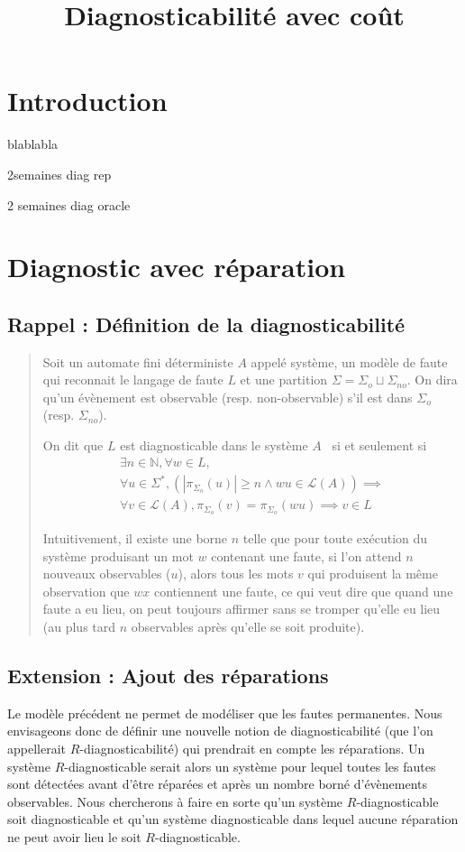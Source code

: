 \documentclass[a4paper,10pt]{article}
\title{Diagnosticabilit\'e avec co\^ut}
\begin{document}
\section*{Introduction}

blablabla

2semaines diag rep

2 semaines diag oracle

\section{Diagnostic avec r\'eparation}
\subsection{Rappel : Définition de la diagnosticabilité}
\begin{quote}
Soit un automate fini d\'eterministe $A$ appel\'e syst\`eme, un modèle de faute qui reconnait le langage de faute $L$ et une partition $\Sigma=\Sigma_o\sqcup \Sigma_{no}$. On dira qu'un \'ev\`enement est observable (resp. non-observable) s'il est dans $\Sigma_o$ (resp. $\Sigma_{no}$).

On dit que $L$ est diagnosticable dans le système $A$~\cite{SamSRST96}  si et seulement si $$\begin{array}{l}
\exists n \in \mathbb N, \forall w \in L,\\
\forall u \in \Sigma^*, \left(\left|\pi_{\Sigma_o}(u)\right|\ge n \land wu \in \mathcal L(A)\right) \implies\\
\forall v \in \mathcal L(A), \pi_{\Sigma_o}(v)=\pi_{\Sigma_o}(wu) \implies v \in L
\end{array}$$

Intuitivement, il existe une borne $n$ telle que pour toute ex\'ecution du système produisant un mot $w$ contenant une faute, si l'on attend $n$ nouveaux observables ($u$), alors tous les mots $v$ qui produisent la m\^eme observation que $wx$ contiennent une faute, ce qui veut dire que quand une faute a eu lieu, on peut toujours affirmer sans se tromper qu'elle eu lieu (au plus tard $n$ observables après qu'elle se soit produite).
\end{quote}

\subsection{Extension : Ajout des r\'eparations}

Le mod\`ele pr\'ec\'edent ne permet de mod\'eliser que les fautes permanentes. Nous envisageons donc de d\'efinir une nouvelle notion de diagnosticabilit\'e (que l'on appellerait $R$-diagnosticabilit\'e) qui prendrait en compte les r\'eparations. Un syst\`eme $R$-diagnosticable serait alors un syst\`eme pour lequel toutes les fautes sont d\'etect\'ees avant d'\^etre r\'epar\'ees et apr\`es un nombre born\'e d'\'ev\`enements observables. Nous chercherons \`a faire en sorte qu'un syst\`eme $R$-diagnosticable soit diagnosticable et qu'un syst\`eme diagnosticable dans lequel aucune r\'eparation ne peut avoir lieu le soit $R$-diagnosticable.
\end{document}
